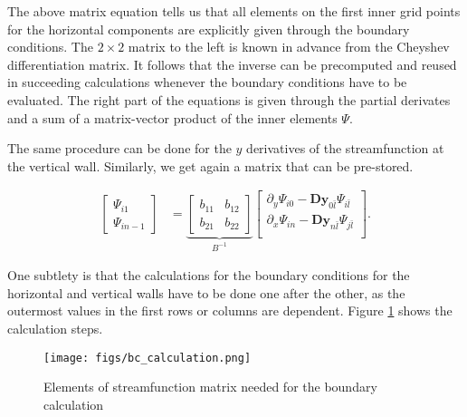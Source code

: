 The above matrix equation tells us that all elements on the first inner grid
points for the horizontal components are explicitly given through the boundary
conditions. The $2 \times 2$ matrix to the left is known in advance from the
Cheyshev differentiation matrix. It follows that the inverse can be precomputed
and reused in succeeding calculations whenever the boundary conditions have to
be evaluated. The right part of the equations is given through the partial
derivates and a sum of a matrix-vector product of the inner elements $\Psi$.

The same procedure can be done for the $y$ derivatives of the streamfunction at
the vertical wall. Similarly, we get again a matrix that can be pre-stored. 

\begin{align}
\begin{bmatrix} \Psi_{i1} \\ \Psi_{in-1}
\end{bmatrix} &=
\underbrace{\begin{bmatrix} b_{11} & b_{12} \\ b_{21} & b_{22} 
\end{bmatrix}}_{B^{-1}}
\begin{bmatrix}
\partial_y\Psi_{i0} - \mathbf{Dy}_{0\bar{l}}\Psi_{i\bar{l}} \\
\partial_x\Psi_{in} - \mathbf{Dy}_{n\bar{l}}\Psi_{j\bar{l}} \\
\end{bmatrix}.
\end{align}

One subtlety is that the calculations for the boundary conditions for the 
horizontal and vertical walls have to be done one after the other, as the
outermost values in the first rows or columns are dependent. Figure
\ref{fig:bc_calc} shows the calculation steps.

\begin{figure}[h]
  \center
  \texttt{[image: figs/bc\_calculation.png]}
\caption{Elements of streamfunction matrix needed for the boundary calculation}
\label{fig:bc_calc}
\end{figure}
